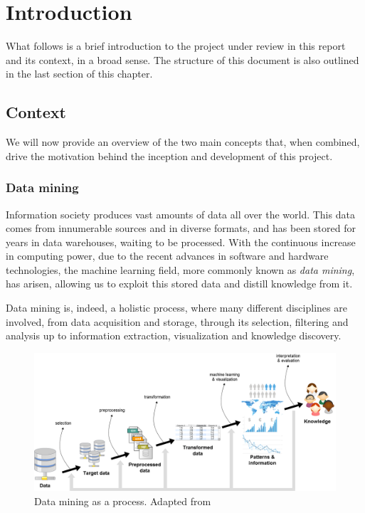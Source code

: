 \chapter{Introduction} %
\label{Chapter1Introduction} %


What follows is a brief introduction to the project under review in this report and its context,
in a broad sense. The structure of this document is also outlined in the last section of this chapter.

\section{Context}
\label{Introduction::Context}

We will now provide an overview of the two main concepts that, when combined,
drive the motivation behind the inception and development of this project.

\subsection{Data mining}
\label{Introduction::Context::DataMining}

Information society produces vast amounts of data all over the world.
This data comes from innumerable sources and in diverse formats, and has been stored
for years in data warehouses, waiting to be processed. With the continuous increase
in computing power, due to the recent advances in software and hardware technologies,
the machine learning field, more commonly known as \textit{data mining}, has arisen,
allowing us to exploit this stored data and distill knowledge from it.

Data mining is, indeed, a holistic process, where many different disciplines are
involved, from data acquisition and storage, through its selection, filtering and
analysis up to information extraction, visualization and knowledge discovery.

\begin{figure}[h]
	\centering
	\includegraphics[width=0.9\linewidth]{figures/data-mining-process.png}
	\caption{Data mining as a process. Adapted from~\citet{Fayyad:FromDataMining}}
	\label{fig:data-mining}
\end{figure}

